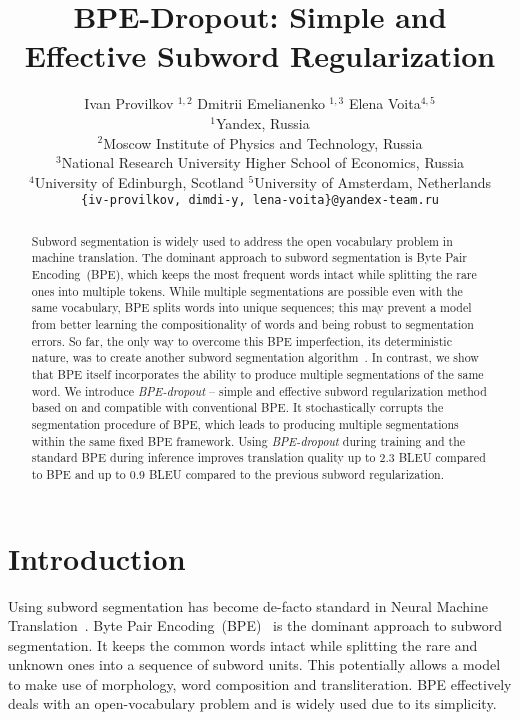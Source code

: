 \documentclass[11pt,a4paper]{article}
\title{BPE-Dropout: Simple and Effective Subword Regularization}
\author{Ivan Provilkov\footnotemark[1]$^{\ \ 1,2}$ \quad Dmitrii Emelianenko\footnotemark[1]$^{\ \ 1,3}$ \quad Elena Voita$^{4,5}$\bigskip\\
  $^1$Yandex, Russia \\
  $^2$Moscow Institute of Physics and Technology, Russia\\
  $^3$National Research University Higher School of Economics, Russia\\
  $^4$University of Edinburgh, Scotland
  \quad $^5$University of Amsterdam, Netherlands\\{\tt \{iv-provilkov, dimdi-y, lena-voita\}@yandex-team.ru}
}
\date{}
\renewcommand{\thefootnote}{\fnsymbol{footnote}}
\begin{document}
\maketitle
\begin{abstract}



  Subword segmentation is widely used to address the open vocabulary problem in machine translation. The dominant approach to subword segmentation is Byte Pair Encoding~(BPE), which keeps the most frequent words intact while splitting the rare ones into multiple tokens. While multiple segmentations are possible even with the same vocabulary, BPE splits words into unique sequences; this may prevent a model from better learning the compositionality of words and being robust to segmentation errors. 
So far, the only way to overcome this BPE imperfection, its deterministic nature, was to create another subword segmentation algorithm~\cite{sentencepiece}. In contrast, we show that BPE itself incorporates the ability to produce multiple segmentations of the same word. 
We introduce \textit{BPE-dropout} -- simple and effective subword regularization method based on and compatible with conventional BPE.
It stochastically corrupts the segmentation procedure of BPE, which leads to producing multiple segmentations within the same fixed BPE framework.
Using \textit{BPE-dropout} during training and the standard BPE during inference improves translation quality up to 2{.}3 BLEU compared to BPE and up to 0{.}9 BLEU compared to the previous subword regularization.
 


\end{abstract}


\renewcommand{\thefootnote}{\arabic{footnote}}

\section{Introduction}


Using subword segmentation has become de-facto standard in Neural Machine Translation~\cite{bojar-etal-2018-findings,barrault-etal-2019-findings}. Byte Pair Encoding~(BPE)~\cite{sennrich-etal-2016-neural} is the dominant approach to subword segmentation. It keeps the common words intact while splitting the rare and unknown ones into a sequence of subword units. This potentially allows a model to make use of morphology, word composition and transliteration. BPE effectively deals with an open-vocabulary problem and is widely used due to its simplicity. 
\end{document}

